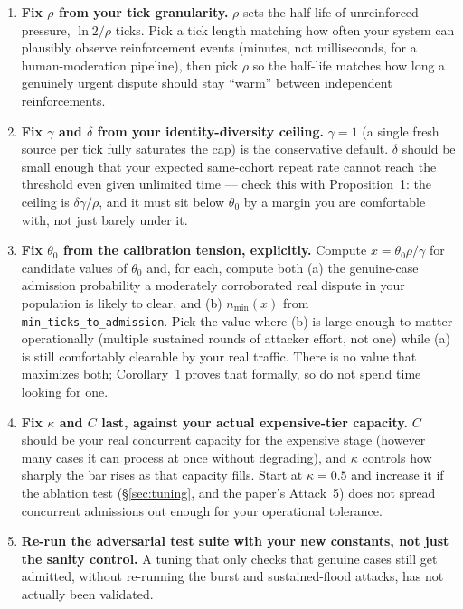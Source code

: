\documentclass[11pt]{article}
\begin{document}
\begin{enumerate}
\item \textbf{Fix $\rho$ from your tick granularity.} $\rho$ sets the
  half-life of unreinforced pressure, $\ln 2/\rho$ ticks. Pick a tick
  length matching how often your system can plausibly observe
  reinforcement events (minutes, not milliseconds, for a
  human-moderation pipeline), then pick $\rho$ so the half-life matches
  how long a genuinely urgent dispute should stay ``warm'' between
  independent reinforcements.
\item \textbf{Fix $\gamma$ and $\delta$ from your identity-diversity
  ceiling.} $\gamma=1$ (a single fresh source per tick fully saturates
  the cap) is the conservative default. $\delta$ should be small enough
  that your expected same-cohort repeat rate cannot reach the threshold
  even given unlimited time --- check this with
  Proposition~1: the ceiling is $\delta\gamma/\rho$, and it must sit
  below $\theta_0$ by a margin you are comfortable with, not just barely
  under it.
\item \textbf{Fix $\theta_0$ from the calibration tension, explicitly.}
  Compute $x = \theta_0\rho/\gamma$ for candidate values of $\theta_0$
  and, for each, compute both (a) the genuine-case admission probability
  a moderately corroborated real dispute in your population is likely to
  clear, and (b) $n_{\min}(x)$ from \texttt{min\_ticks\_to\_admission}.
  Pick the value where (b) is large enough to matter operationally
  (multiple sustained rounds of attacker effort, not one) while (a) is
  still comfortably clearable by your real traffic. There is no value
  that maximizes both; Corollary~1 proves that formally, so do not spend
  time looking for one.
\item \textbf{Fix $\kappa$ and $C$ last, against your actual expensive-tier
  capacity.} $C$ should be your real concurrent capacity for the
  expensive stage (however many cases it can process at once without
  degrading), and $\kappa$ controls how sharply the bar rises as that
  capacity fills. Start at $\kappa=0.5$ and increase it if the ablation
  test (\S\ref{sec:tuning}, and the paper's Attack~5) does not spread
  concurrent admissions out enough for your operational tolerance.
\item \textbf{Re-run the adversarial test suite with your new constants,
  not just the sanity control.} A tuning that only checks that genuine
  cases still get admitted, without re-running the burst and
  sustained-flood attacks, has not actually been validated.
\end{enumerate}
\end{document}
